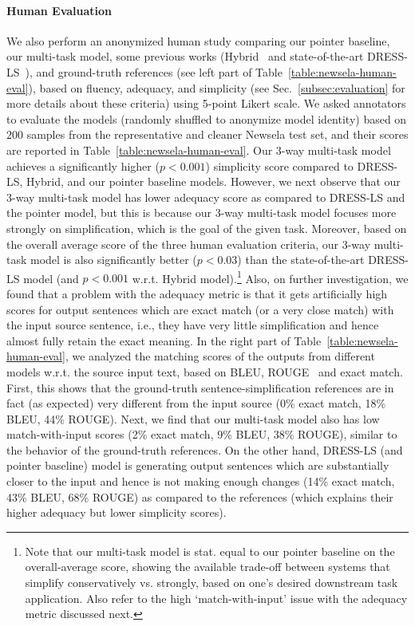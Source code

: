 \documentclass[11pt]{article}
\begin{document}
\paragraph{Human Evaluation}
We also perform an anonymized human study comparing our pointer baseline, our multi-task model, some previous works (Hybrid~\cite{Narayan2014HybridSU} and state-of-the-art DRESS-LS~\cite{zhang2017dress}), and ground-truth references (see left part of Table~\ref{table:newsela-human-eval}), based on fluency, adequacy, and simplicity (see Sec.~\ref{subsec:evaluation} for more details about these criteria) using 5-point Likert scale. We asked annotators to evaluate the models (randomly shuffled to anonymize model identity) based on $200$ samples from the representative and cleaner Newsela test set, and their scores are reported in Table~\ref{table:newsela-human-eval}.
Our 3-way multi-task model achieves a significantly higher ($p<0.001$) simplicity score compared to DRESS-LS, Hybrid, and our pointer baseline models. 
However, we next observe that our 3-way multi-task model has lower adequacy score as compared to DRESS-LS and the pointer model, but this is because our 3-way multi-task model focuses more strongly on simplification, which is the goal of the given task. 
Moreover, based on the overall average score of the three human evaluation criteria, our 3-way multi-task model is also significantly better ($p<0.03$) than the state-of-the-art DRESS-LS model (and $p<0.001$ w.r.t. Hybrid model).\footnote{Note that our multi-task model is stat. equal to our pointer baseline on the overall-average score, showing the available trade-off between systems that simplify conservatively vs. strongly, based on one's desired downstream task application. Also refer to the high `match-with-input' issue with the adequacy metric discussed next.} 
Also, on further investigation, we found that a problem with the adequacy metric is that it gets artificially high scores for output sentences which are exact match (or a very close match) with the input source sentence, i.e., they have very little simplification and hence almost fully retain the exact meaning. In the right part of Table~\ref{table:newsela-human-eval}, we analyzed the matching scores of the outputs from different models w.r.t. the source input text, based on BLEU, ROUGE~\cite{lin2004rouge} and exact match. First, this shows that the ground-truth sentence-simplification references are in fact (as expected) very different from the input source (0\% exact match, 18\% BLEU, 44\% ROUGE). Next, we find that our multi-task model also has low match-with-input scores (2\% exact match, 9\% BLEU, 38\% ROUGE), similar to the behavior of the ground-truth references. On the other hand, DRESS-LS (and pointer baseline) model is generating output sentences which are substantially closer to the input and hence is not making enough changes (14\% exact match, 43\% BLEU, 68\% ROUGE) as compared to the references (which explains their higher adequacy but lower simplicity scores).
 
\end{document}
